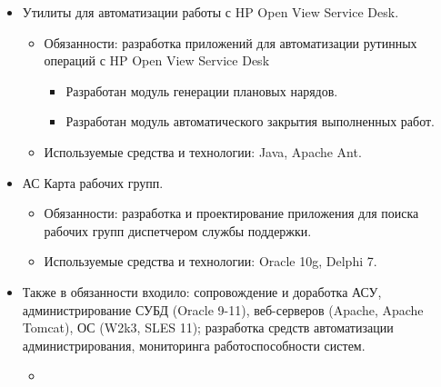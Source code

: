 \documentclass[14pt,a4paper]{moderncv}
\begin{document}
{\begin{itemize}
\begin{itemize}
    \item Используемые средства и технологии: PHP, MS SQL Server, Java, Apache Ant.
  \end{itemize}
\item Утилиты для автоматизации работы с HP Open View Service Desk.
  \begin{itemize}%
    \item Обязанности: разработка приложений для автоматизации рутинных операций с HP Open View Service Desk
      \begin{itemize}%
        \item Разработан модуль генерации плановых нарядов.
        \item Разработан модуль автоматического закрытия выполненных работ.
      \end{itemize}
    \item Используемые средства и технологии: Java, Apache Ant.
  \end{itemize}
\item АС Карта рабочих групп.
  \begin{itemize}%
    \item Обязанности: разработка и проектирование приложения для поиска рабочих групп диспетчером службы поддержки.
    \item Используемые средства и технологии: Oracle 10g, Delphi 7.
  \end{itemize}
\item[] Также в обязанности входило: сопровождение и доработка АСУ, администрирование СУБД (Oracle 9-11), веб-серверов (Apache, Apache Tomcat), ОС (W2k3, SLES 11); разработка средств автоматизации администрирования, мониторинга работоспособности систем.
  \begin{itemize}
    \item[]
  \end{itemize}
\end{itemize}}

\end{document}
